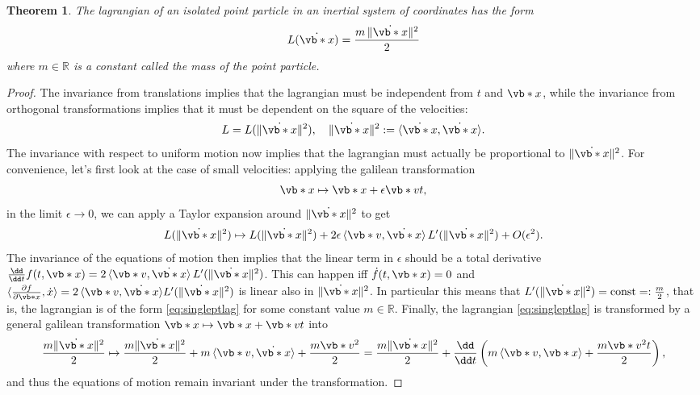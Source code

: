\documentclass[english,fontsize=11pt,paper=b5]{scrbook}
\newtheorem{theorem}{Theorem}[chapter]
\theoremstyle{definition}
\begin{document}
    \begin{theorem}
      The lagrangian of an isolated point particle in an inertial system of coordinates has the form
      \begin{equation}\label{eq:singleptlag}
        L(\dot{\vb*{x}}) = \frac{m\,\|\dot{\vb*{x}}\|^2}2
      \end{equation}
      where $m\in\mathbb{R}$ is a constant called the \emph{mass} of the point particle.
    \end{theorem}
    \begin{proof}
      The invariance from translations implies that the lagrangian must be independent from $t$ and $\vb*{x}$, while the invariance from orthogonal transformations implies that it must be dependent on the square of the velocities:
      \begin{equation}
        L = L(\|\dot{\vb*{x}}\|^2), \quad \|\dot{\vb*{x}}\|^2 := \langle\dot{\vb*{x}}, \dot{\vb*{x}}\rangle.
      \end{equation}
      The invariance with respect to uniform motion now implies that the lagrangian must actually be proportional to $\|\dot{\vb*{x}}\|^2$.
      For convenience, let's first look at the case of small velocities: applying the galilean transformation
      \begin{equation}
        \vb*{x} \mapsto \vb*{x} + \epsilon \vb*{v}t,
      \end{equation}
      in the limit $\epsilon \to 0$, we can apply a Taylor expansion around $\|\dot{\vb*{x}}\|^2$ to get
      \begin{equation}
        L(\|\dot{\vb*{x}}\|^2) \mapsto L(\|\dot{\vb*{x}}\|^2) + 2\epsilon\,\langle\vb*{v}, \dot{\vb*{x}}\rangle\,L'(\|\dot{\vb*{x}}\|^2) + O(\epsilon^2).
      \end{equation}
      The invariance of the equations of motion then implies that the linear term in $\epsilon$ should be a total derivative $\frac{\dd }{\dd t} f(t, \vb*{x}) = 2\,\langle\vb*{v}, \dot{\vb*{x}}\rangle\,L'(\|\dot{\vb*{x}}\|^2)$.
      This can happen iff $\dot f(t, \vb*{x}) = 0$ and $\langle \frac{\partial f}{\partial \vb*{x}}, \dot x\rangle  = 2\,\langle\vb*{v}, \dot{\vb*{x}}\rangle L'(\|\dot{\vb*{x}}\|^2)$ is linear also in $\|\dot{\vb*{x}}\|^2$.
      In particular this means that $L'(\|\dot{\vb*{x}}\|^2) = \mathrm{const} =: \frac{m}2$, that is, the lagrangian is of the form \eqref{eq:singleptlag} for some constant value $m\in\mathbb{R}$.
      Finally, the lagrangian \eqref{eq:singleptlag} is transformed by a general galilean transformation $\vb*{x} \mapsto \vb*{x} + \vb*{v}t$ into
      \begin{equation}
        \frac{m \|\dot{\vb*{x}}\|^2}2 \mapsto
        \frac{m \|\dot{\vb*{x}}\|^2}2 + m\,\langle\vb*{v},\dot{\vb*{x}}\rangle + \frac{m \vb*{v}^2}2
        = \frac{m \|\dot{\vb*{x}}\|^2}2 + \frac{\dd }{\dd t}\left(m\,\langle\vb*{v},\vb*{x}\rangle + \frac{m \vb*{v}^2 t}2\right),
      \end{equation}
      and thus the equations of motion remain invariant under the transformation.
    \end{proof}
\end{document}
